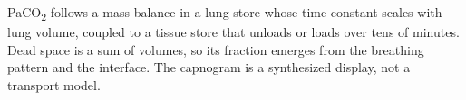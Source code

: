 \begin{summarybox}
PaCO\textsubscript{2} follows a mass balance in a lung store whose time constant scales with lung volume, coupled to a tissue store that unloads or loads over tens of minutes. Dead space is a sum of volumes, so its fraction emerges from the breathing pattern and the interface. The capnogram is a synthesized display, not a transport model.
\end{summarybox}
